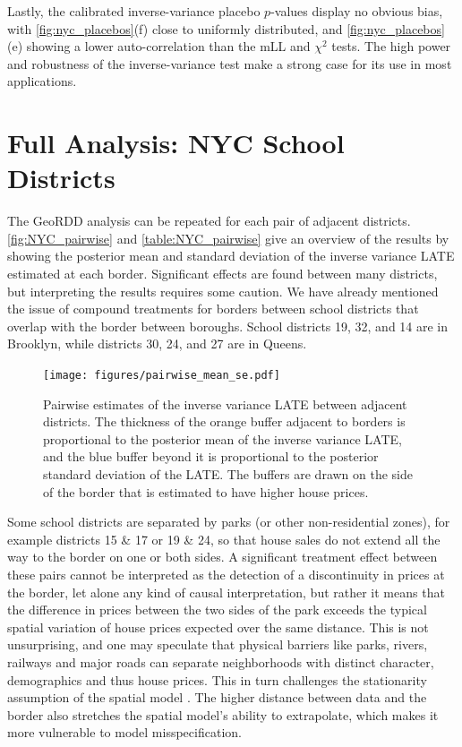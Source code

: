 	Lastly, the calibrated inverse-variance placebo \(p\)-values display no obvious bias, with \autoref{fig:nyc_placebos}(f) close to uniformly distributed, and \autoref{fig:nyc_placebos}(e) showing a lower auto-correlation than the mLL and \(\chi^2\) tests.
The high power and robustness of the inverse-variance test make a strong case for its use in most applications.


\section{Full Analysis: NYC School Districts}
\label{pairs-of-school-districts}




	The GeoRDD analysis can be repeated for each pair of adjacent districts.
\autoref{fig:NYC_pairwise} and \autoref{table:NYC_pairwise} give an overview of the results by showing the posterior mean and standard deviation of the inverse variance LATE estimated at each border.
Significant effects are found between many districts, but interpreting the results requires some caution.
We have already mentioned the issue of compound treatments for borders between school districts that overlap with the border between boroughs.
School districts 19, 32, and 14 are in Brooklyn, while districts 30, 24, and 27 are in Queens.


\begin{figure}[!tb]
    \centering
    \texttt{[image: figures/pairwise\_mean\_se.pdf]}
    \caption{
		\label{fig:NYC_pairwise}
        Pairwise estimates of the inverse variance LATE between adjacent districts.
        The thickness of the orange buffer adjacent to borders is proportional to the posterior mean of the inverse variance LATE, and the blue buffer beyond it is proportional to the posterior standard deviation of the LATE.
    The buffers are drawn on the side of the border that is estimated to have higher house prices.}
\end{figure}

	Some school districts are separated by parks (or other non-residential zones), for example districts 15 \& 17 or 19 \& 24, so that house sales do not extend all the way to the border on one or both sides.
A significant treatment effect between these pairs cannot be interpreted as the detection of a discontinuity in prices at the border, let alone any kind of causal interpretation, but rather it means that the difference in prices between the two sides of the park exceeds the typical spatial variation of house prices expected over the same distance.
This is not unsurprising, and one may speculate that physical barriers like parks, rivers, railways and major roads can separate neighborhoods with distinct character, demographics and thus house prices.
This in turn challenges the stationarity assumption of the spatial model .
The higher distance between data and the border also stretches the spatial model's ability to extrapolate, which makes it more vulnerable to model misspecification.

